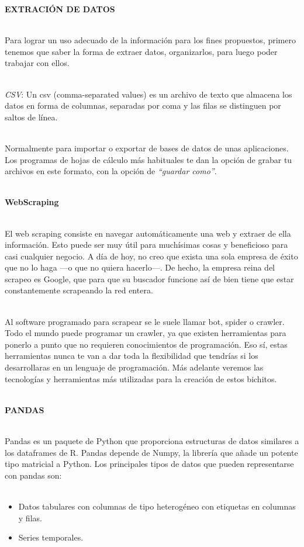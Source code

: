 \documentclass[conference,compsoc,onecolumn]{IEEEtran}
\begin{document}
\textbf{EXTRACIÓN DE DATOS}
\\\

Para lograr un uso adecuado de la información para los fines propuestos, primero tenemos que saber la forma de extraer datos, organizarlos, para luego poder trabajar con ellos.
\\\

 \textsl{CSV}: Un csv (comma-separated values) es un archivo de texto que almacena los datos en forma de columnas, separadas por coma y las filas se distinguen por saltos de línea.
 \\\
 
 Normalmente para importar o exportar de bases de datos de unas aplicaciones. Los programas de hojas de cálculo más habituales te dan la opción de grabar tu archivos en este formato, con la opción de  \textsl{“guardar como”}.~\cite{8}
 \\\

\textbf{WebScraping}
\\\

El web scraping consiste en navegar automáticamente una web y extraer de ella información. Esto puede ser muy útil para muchísimas cosas y beneficioso para casi cualquier negocio. A día de hoy, no creo que exista una sola empresa de éxito que no lo haga —o que no quiera hacerlo—. De hecho, la empresa reina del scrapeo es Google, que para que su buscador funcione así de bien tiene que estar constantemente scrapeando la red entera.
\\\

Al software programado para scrapear se le suele llamar bot, spider o crawler. Todo el mundo puede programar un crawler, ya que existen herramientas para ponerlo a punto que no requieren conocimientos de programación. Eso sí, estas herramientas nunca te van a dar toda la flexibilidad que tendrías si los desarrollaras en un lenguaje de programación. Más adelante veremos las tecnologías y herramientas más utilizadas para la creación de estos bichitos.~\cite{9}
\\\

\textbf{PANDAS}
\\\

Pandas es un paquete de Python que proporciona estructuras de datos similares a los dataframes de R. Pandas depende de Numpy, la librería que añade un potente tipo matricial a Python. Los principales tipos de datos que pueden representarse con pandas son:
\\\

\begin{itemize}
\item Datos tabulares con columnas de tipo heterogéneo con etiquetas en columnas y filas.
\item Series temporales.~\cite{10}
\end{itemize}
\\\
\end{document}
